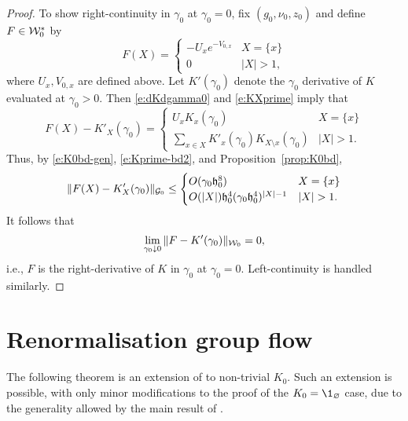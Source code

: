 \begin{proof}
To show right-continuity in $\gamma_0$ at $\gamma_0 = 0$,
fix $(g_0, \nu_0, z_0)$ and define $F \in \mathcal{W}^*_0$ by
\begin{equation}
F(X) =
\begin{cases}
  -U_x e^{-V_{0,x}}
    & X = \{ x \} \\
  0 & |X| > 1,
\end{cases}
\end{equation}
where $U_x, V_{0,x}$ are defined above.
Let $K'(\gamma_0)$ denote the $\gamma_0$ derivative of $K$ evaluated at $\gamma_0 > 0$.  Then
\eqref{e:dKdgamma0} and \eqref{e:KXprime} imply that
\begin{equation}
F(X) - K'_X(\gamma_0)
  =
\begin{cases}
  U_x K_x(\gamma_0)
    & X = \{ x \} \\
  \sum_{x \in X} K'_x(\gamma_0) K_{X \setminus x}(\gamma_0)
    & |X| > 1.
\end{cases}
\end{equation}
Thus, by \eqref{e:K0bd-gen}, \eqref{e:Kprime-bd2}, and Proposition~\ref{prop:K0bd},
\begin{equation}
\|F(X) - K'_X(\gamma_0)\|_{\mathcal{G}_0}
  \le
\begin{cases}
  O(\gamma_0 \mathfrak{h}_0^8)
    & X = \{ x \} \\
  O(|X|) \mathfrak{h}_0^4 (\gamma_0 \mathfrak{h}_0^4)^{|X|-1}
    & |X| > 1.
\end{cases}
\end{equation}
It follows that
\begin{equation}
\lim_{\gamma_0\downarrow 0} \|F - K'(\gamma_0)\|_{\mathcal{W}_0} = 0,
\end{equation}
i.e., $F$ is the right-derivative of $K$ in $\gamma_0$ at $\gamma_0 = 0$.
Left-continuity is handled similarly.
\end{proof}

\section{Renormalisation group flow}
\label{sec:flow}

The following theorem is an extension of \cite[Proposition~\ref{log-prop:flow-flow}]{BBS-saw4-log}
to non-trivial $K_0$. Such an extension is possible,
with only minor modifications to the proof of the $K_0 = \1_\varnothing$ case,
due to the generality allowed by the main result of \cite{BBS-rg-flow}.

